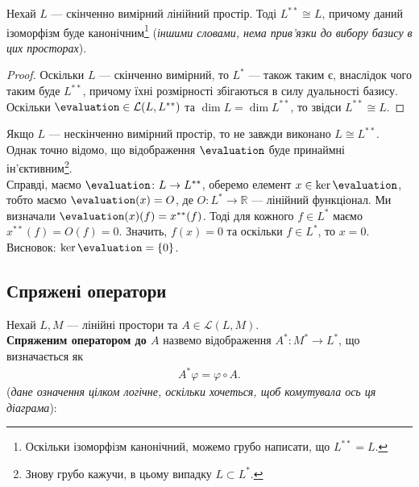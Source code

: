 \documentclass{math_library}
\begin{document}
\begin{theorem}
Нехай $L$ --- скінченно вимірний лінійний простір. Тоді $L^{**} \cong L$, причому даний ізоморфізм буде канонічним\footnote{Оскільки ізоморфізм канонічний, можемо грубо написати, що $L^{**} = L$.} (\textit{іншими словами, нема прив'язки до вибору базису в цих просторах}).
\end{theorem}

\begin{proof}
Оскільки $L$ --- скінченно вимірний, то $L^*$ --- також таким є, внаслідок чого таким буде $L^{**}$, причому їхні розмірності збігаються в силу дуальності базису. Оскільки $\evaluation \in \mathcal{L}(L,L^{**})$ та $\dim L = \dim L^{**}$, то звідси $L^{**} \cong L$.
\end{proof}

\begin{remark}
Якщо $L$ --- нескінченно вимірний простір, то не завжди виконано $L \cong L^{**}$. Однак точно відомо, що відображення $\evaluation$ буде принаймні ін'єктивним\footnote{Знову грубо кажучи, в цьому випадку $L \subset L^*$.}.
\bigskip \\
Справді, маємо $\evaluation \colon L \to L^{**}$, оберемо елемент $x \in \ker \evaluation$, тобто маємо $\evaluation(x) = O$, де $O \colon L^* \to \mathbb{R}$ --- лінійний функціонал. Ми визначали $\evaluation(x)(f) = x^{**}(f)$. Тоді для кожного $f \in L^*$ маємо $x^{**}(f) = O(f) = 0$. Значить, $f(x) = 0$ та оскільки $f \in L^*$, то $x = 0$. Висновок: $\ker \evaluation = \{0\}$.
\end{remark}

\subsection{Спряжені оператори}
\begin{definition}
Нехай $L,M$ --- лінійні простори та $A \in \mathcal{L}(L,M)$.\\
\textbf{Спряженим оператором до $A$} назвемо відображення $A^* \colon M^* \to L^*$, що визначається як
\begin{align*}
A^* \varphi = \varphi \circ A.
\end{align*}
(\textit{дане означення цілком логічне, оскільки хочеться, щоб комутувала ось ця діаграма}):
\begin{figure}[H]
\centering
{}
\end{figure}
\end{definition}
\end{document}
